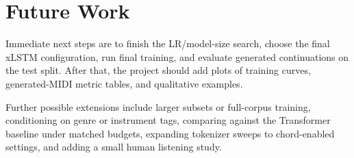 \section{Future Work}

Immediate next steps are to finish the LR/model-size search, choose the final xLSTM configuration, run final training, and evaluate generated continuations on the test split. After that, the project should add plots of training curves, generated-MIDI metric tables, and qualitative examples.

Further possible extensions include larger subsets or full-corpus training, conditioning on genre or instrument tags, comparing against the Transformer baseline under matched budgets, expanding tokenizer sweeps to chord-enabled settings, and adding a small human listening study.
